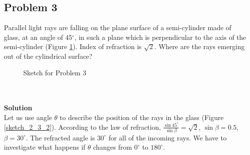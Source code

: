 \documentclass[12pt,a4paper]{book}
\begin{document}
	\subsection*{Problem 3}
	Parallel light rays are falling on the plane surface of a semi-cylinder made of glass, at an angle of 45$^{\circ}$, in such a plane which is perpendicular to the axis of the semi-cylinder (Figure \ref{sketch_2_3_1}). Index of refraction is $\sqrt{2}$. Where are the rays emerging out of the cylindrical surface?
	\begin{figure}[!hbtp]
		\centering
		\caption{Sketch for Problem 3}
		\label{sketch_2_3_1}
	\end{figure}\\ \\
	\textbf{Solution}\\
	Let us use angle $\theta$ to describe the position of the rays in the glass (Figure \ref{sketch_2_3_2}). According to the law of refraction, $\frac{\sin 45^{\circ}}{\sin \beta}=\sqrt{2}$, $\sin\beta=0.5$, $\beta=30^{\circ}$. The refracted angle is $30^{\circ}$ for all of the incoming rays. We have to investigate what happens if $\theta$ changes from $0^{\circ}$ to $180^{\circ}$.\par
\end{document}
